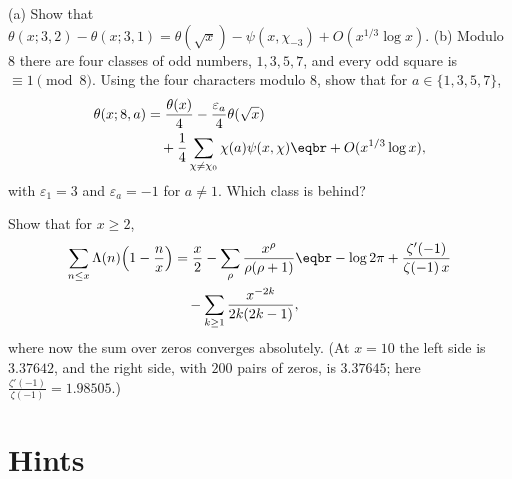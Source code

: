 \begin{exercise}\label{ex:bias}
(a) Show that $\theta(x;3,2)-\theta(x;3,1)=\theta(\sqrt x)-\psi(x,\chi_{-3})+O(x^{1/3}\log x)$.
(b) Modulo $8$ there are four classes of odd numbers, $1,3,5,7$, and every odd square is $\equiv1\pmod8$. Using the four characters modulo $8$, show that for $a\in\{1,3,5,7\}$,
\[
\begin{aligned}\theta(x;8,a)&=\frac{\theta(x)}4-\frac{\varepsilon_a}4\theta(\sqrt x)\\&\quad+\frac14\sum_{\chi\ne\chi_0}\chi(a)\psi(x,\chi)\eqbr+O(x^{1/3}\log x),\end{aligned}
\]
with $\varepsilon_1=3$ and $\varepsilon_a=-1$ for $a\ne1$. Which class is behind?
\end{exercise}

\begin{exercise}[$\star\star\star$]\label{ex:cesaro}
Show that for $x\ge2$,
\[
\begin{aligned}\sum_{n\le x}\Lambda(n)\Bigl(1-\frac nx\Bigr)&=\frac x2-\sum_\rho\frac{x^\rho}{\rho(\rho+1)}\eqbr-\log2\pi+\frac{\zeta'(-1)}{\zeta(-1)\,x}\\&\quad-\sum_{k\ge1}\frac{x^{-2k}}{2k(2k-1)},\end{aligned}
\]
where now the sum over zeros converges absolutely. (At $x=10$ the left side is $3.37642$, and the right side, with $200$ pairs of zeros, is $3.37645$; here $\frac{\zeta'(-1)}{\zeta(-1)}=1.98505$.)
\end{exercise}

\section{Hints}

